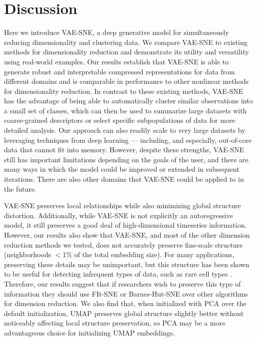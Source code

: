 \documentclass[11pt,a4paper,oneside]{book}
\begin{document}
\section{Discussion}
Here we introduce VAE-SNE, a deep generative model for simultaneously reducing dimensionality and clustering data. We compare VAE-SNE to existing methods for dimensionality reduction and demonstrate its utility and versatility using real-world examples. Our results establish that VAE-SNE is able to generate robust and interpretable compressed representations for data from different domains and is comparable in performance to other nonlinear methods for dimensionality reduction. In contrast to these existing methods, VAE-SNE has the advantage of being able to automatically cluster similar observations into a small set of classes, which can then be used to summarize large datasets with coarse-grained descriptors or select specific subpopulations of data for more detailed analysis. Our approach can also readily scale to very large datasets by leveraging techniques from deep learning --- including, and especially, out-of-core data that cannot fit into memory. However, despite these strengths, VAE-SNE still has important limitations depending on the goals of the user, and there are many ways in which the model could be improved or extended in subsequent iterations. There are also other domains that VAE-SNE could be applied to in the future.

VAE-SNE preserves local relationships while also minimizing global structure distortion. Additionally, while VAE-SNE is not explicitly an autoregressive model, it still preserves a good deal of high-dimensional timeseries information. However, our results also show that VAE-SNE, and most of the other dimension reduction methods we tested, does not accurately preserve fine-scale structure (neighborhoods $<$1\% of the total embedding size). For many applications, preserving these details may be unimportant, but this structure has been shown to be useful for detecting infrequent types of data, such as rare cell types \citep{linderman2019fast}. Therefore, our results suggest that if researchers wish to preserve this type of information they should use FIt-SNE \citep{linderman2017efficient, linderman2019fast} or Barnes-Hut-SNE \citep{van2014accelerating} over other algorithms for dimension reduction. We also find that, when initialized with PCA over the default initialization, UMAP \citep{mcinnes2018umap} preserves global structure slightly better without noticeably affecting local structure preservation, so PCA may be a more advantageous choice for initializing UMAP embeddings.
\end{document}
